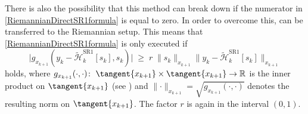There is also the possibility that this method can break down if the numerator in \cref{RiemannianDirectSR1formula} is equal to zero. In order to overcome this, can be transferred to the Riemannian setup. This means that \cref{RiemannianDirectSR1formula} is only executed if
\begin{equation}\label{RiemannianSafeguard}
    \lvert g_{x_{k+1}}(y_k - \widetilde{\mathcal{H}}^\mathrm{SR1}_k [s_k], s_k) \lvert \; \geq \; r \; \lVert s_k \rVert_{x_{k+1}} \lVert y_k - \widetilde{\mathcal{H}}^\mathrm{SR1}_k [s_k] \rVert_{x_{k+1}} 
\end{equation}
holds, where $g_{x_{k+1}}(\cdot, \cdot) \colon \; \tangent{x_{k+1}} \times \tangent{x_{k+1}} \to \mathbb{R}$ is the inner product on $\tangent{x_{k+1}}$ (see \cite[p.~6]{BergmannHerzogLouzeiroSilvaTenbrinckVidalNunez:2020:1}) and $ \lVert \cdot \rVert_{x_{k+1}} = \sqrt{g_{x_{k+1}}(\cdot, \cdot)}$ denotes the resulting norm on $\tangent{x_{k+1}}$. The factor $r$ is again in the interval $(0,1)$. \\



